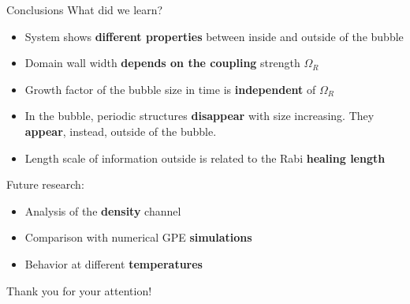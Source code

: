 \documentclass[aspectratio=169]{beamer}
\newcommand{\backupbegin}{
    \newcounter{finalframe}
    \setcounter{finalframe}{\value{framenumber}}
}
\newcommand{\backupend}{
    \setcounter{framenumber}{\value{finalframe}}
}
\begin{document}
\begin{frame}{Conclusions}
  What did we learn?
  \begin{itemize}
    \item System shows \textbf{different properties} between inside and outside of the bubble
    \item Domain wall width \textbf{depends on the coupling} strength $\Omega_R$
    \item Growth factor of the bubble size in time is \textbf{independent} of $\Omega_R$
    \item In the bubble, periodic structures \textbf{disappear} with size increasing. They \textbf{appear}, instead, outside of the bubble.
    \item Length scale of information outside is related to the Rabi \textbf{healing length}
  \end{itemize}
  \pause
  Future research:
  \begin{itemize}
    \item Analysis of the \textbf{density} channel
    \item Comparison with numerical GPE \textbf{simulations}
    \item Behavior at different \textbf{temperatures}
  \end{itemize}
\end{frame}

\begin{frame}
  \huge
  Thank you for your attention!
\end{frame}

  
\end{document}
